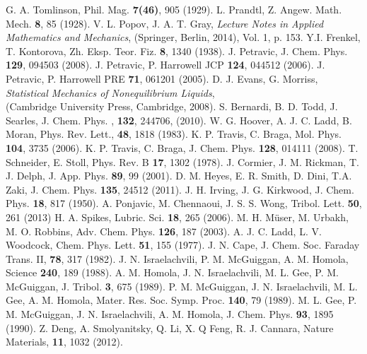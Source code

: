 \begin{thebibliography}{3}
\begin{spacing}{1.0}
 G. A. Tomlinson, Phil. Mag. {\bf 7(46)}, 905 (1929).
 L. Prandtl, Z. Angew. Math. Mech. {\bf 8}, 85 (1928).
 V. L. Popov, J. A. T. Gray, {\it Lecture Notes in Applied Mathematics and Mechanics}, (Springer, Berlin, 2014), Vol. 1, p. 153.
 Y.I. Frenkel, T. Kontorova, Zh. Eksp. Teor. Fiz. {\bf 8}, 1340 (1938).
%
 J. Petravic, J. Chem. Phys. {\bf 129}, 094503 (2008).
 J. Petravic, P. Harrowell JCP {\bf 124}, 044512 (2006).
 J. Petravic, P. Harrowell PRE {\bf 71}, 061201 (2005).
 D. J. Evans, G. Morriss, {\it Statistical Mechanics of Nonequilibrium Liquids}, \\(Cambridge University Press, Cambridge, 2008).
 S. Bernardi, B. D. Todd, J. Searles, J. Chem. Phys. , {\bf 132}, 244706, (2010). 
 W. G. Hoover, A. J. C. Ladd, B. Moran, Phys. Rev. Lett., {\bf 48}, 1818 (1983).
 K. P. Travis, C. Braga, Mol. Phys. {\bf 104}, 3735 (2006).
 K. P. Travis, C. Braga, J. Chem. Phys. {\bf 128}, 014111 (2008).
 T. Schneider, E. Stoll, Phys. Rev. B {\bf 17}, 1302 (1978).
 J. Cormier, J. M. Rickman, T. J. Delph, J. App. Phys. {\bf 89}, 99 (2001).
 D. M. Heyes, E. R. Smith, D. Dini, T.A. Zaki, J. Chem. Phys. {\bf 135}, 24512 (2011).
 J. H. Irving, J. G. Kirkwood, J. Chem. Phys. {\bf 18}, 817 (1950).
 A. Ponjavic, M. Chennaoui, J. S. S. Wong, Tribol. Lett. {\bf 50}, 261 (2013)
 H. A. Spikes, Lubric. Sci. {\bf 18}, 265 (2006).
 M. H. M{\"u}ser, M. Urbakh, M. O. Robbins, Adv. Chem. Phys. {\bf 126}, 187 (2003).
 A. J. C. Ladd, L. V. Woodcock, Chem. Phys. Lett. {\bf 51}, 155 (1977).
 J. N. Cape, J. Chem. Soc. Faraday Trans. II, {\bf 78}, 317 (1982).
 J. N. Israelachvili, P. M. McGuiggan, A. M. Homola, Science {\bf 240}, 189 (1988).
 A. M. Homola, J. N. Israelachvili, M. L. Gee, P. M. McGuiggan, J. Tribol. {\bf 3}, 675 (1989).
 P. M. McGuiggan, J. N. Israelachvili, M. L. Gee, A. M. Homola, Mater. Res. Soc. Symp. Proc. {\bf 140}, 79 (1989).
 M. L. Gee, P. M. McGuiggan, J. N. Israelachvili, A. M. Homola, J. Chem. Phys. {\bf 93}, 1895 (1990).
 Z. Deng, A. Smolyanitsky, Q. Li, X. Q Feng, R. J. Cannara, Nature Materials, {\bf 11}, 1032 (2012).

\end{spacing}
\end{thebibliography}
